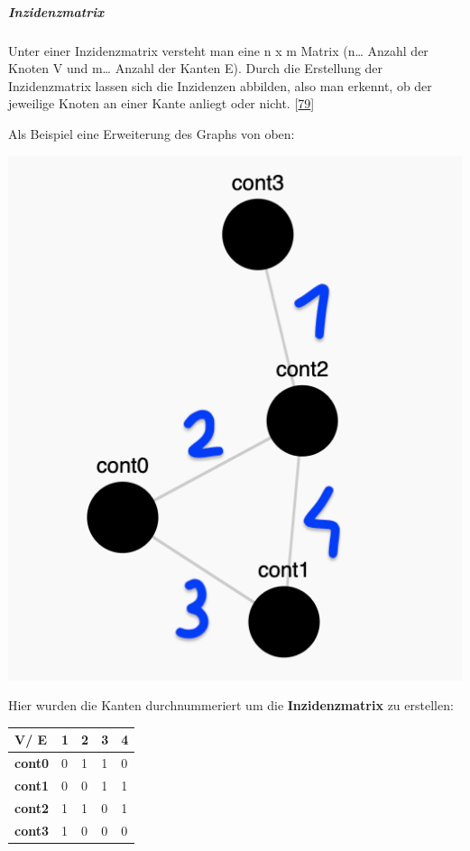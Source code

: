 \documentclass[
    headings=optiontotocandhead,%
    twoside,
    numbers=noenddot,%
    12pt, %
    titlepage, %
    parskip=full, %
    listof=leveldown, 
    numbers=noenddot, %
    a4paper,DIV=14,
    BCOR=15mm,
]{scrbook}
\let\origfigure=\figure
\let\endorigfigure=\endfigure
\renewenvironment{figure}[1][]{%
   \origfigure[H]
}{%
   \endorigfigure
}
\begin{document}
\hypertarget{inzidenzmatrix}{%
\subparagraph{Inzidenzmatrix}\label{inzidenzmatrix}}

Unter einer Inzidenzmatrix versteht man eine n x m Matrix (n\ldots{}
Anzahl der Knoten V und m\ldots{} Anzahl der Kanten E). Durch die
Erstellung der Inzidenzmatrix lassen sich die Inzidenzen abbilden, also
man erkennt, ob der jeweilige Knoten an einer Kante anliegt oder nicht.
{[}\protect\hyperlink{ref-BWL-Lexikon-Inzidenzmatrix}{79}{]}

Als Beispiel eine Erweiterung des Graphs von oben:

\begin{figure}
\centering
\includegraphics{img/Gekle/GraphExampleExtended.png}
\caption{Nummerierung der Kanten des obrigen Graphen}
\end{figure}

Hier wurden die Kanten durchnummeriert um die \textbf{Inzidenzmatrix} zu
erstellen:

\begin{longtable}[]{@{}lllll@{}}
\toprule
\textbf{V/ E} & \textbf{1} & \textbf{2} & \textbf{3} &
\textbf{4}\tabularnewline
\midrule
\endhead
\textbf{cont0} & 0 & 1 & 1 & 0\tabularnewline
\textbf{cont1} & 0 & 0 & 1 & 1\tabularnewline
\textbf{cont2} & 1 & 1 & 0 & 1\tabularnewline
\textbf{cont3} & 1 & 0 & 0 & 0\tabularnewline
\bottomrule
\end{longtable}
\end{document}
